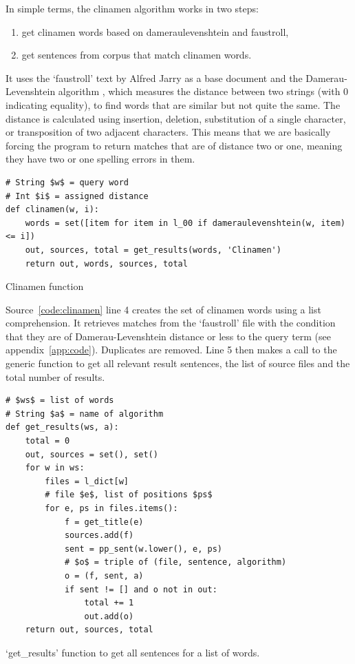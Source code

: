 In simple terms, the clinamen algorithm works in two steps:
\begin{enumerate}
  \item get clinamen words based on dameraulevenshtein and faustroll,
  \item get sentences from corpus that match clinamen words.
\end{enumerate}


It uses the `faustroll' text by Alfred Jarry \citeyear{Jarry1996} as a base document and the Damerau-Levenshtein algorithm \parencite{Damerau1964, Levenshtein1966}, which measures the distance between two strings (with \num{0} indicating equality), to find words that are similar but not quite the same. The distance is calculated using insertion, deletion, substitution of a single character, or transposition of two adjacent characters. This means that we are basically forcing the program to return matches that are of distance two or one, meaning they have two or one spelling errors in them.

\begin{listing}
  \begin{verbatim}
# String $w$ = query word
# Int $i$ = assigned distance
def clinamen(w, i):
    words = set([item for item in l_00 if dameraulevenshtein(w, item) <= i])
    out, sources, total = get_results(words, 'Clinamen')
    return out, words, sources, total
  \end{verbatim}
\caption{Clinamen function}
\label{code:clinamen}
\end{listing}

Source~\ref{code:clinamen} line \num{4} creates the set of clinamen words using a list comprehension. It retrieves matches from the `faustroll' file  with the condition that they are of Damerau-Levenshtein distance  or less to the query term  (see appendix~\ref{app:code}). Duplicates are removed. Line \num{5} then makes a call to the generic  function to get all relevant result sentences, the list of source files and the total number of results.

\begin{listing}
  \begin{verbatim}
# $ws$ = list of words
# String $a$ = name of algorithm
def get_results(ws, a):
    total = 0
    out, sources = set(), set()
    for w in ws:
        files = l_dict[w]
        # file $e$, list of positions $ps$
        for e, ps in files.items():
            f = get_title(e)
            sources.add(f)
            sent = pp_sent(w.lower(), e, ps)
            # $o$ = triple of (file, sentence, algorithm)
            o = (f, sent, a)
            if sent != [] and o not in out:
                total += 1
                out.add(o)
    return out, sources, total
  \end{verbatim}
\caption{`get\_results' function to get all sentences for a list of words.}
\label{code:getresults}
\end{listing}


